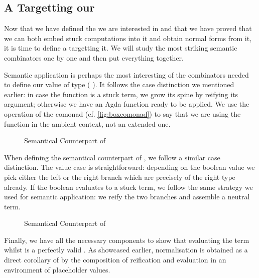 \subsection{A  Targetting our }

Now that we have defined the  we are interested in and that
we have proved that we can both embed stuck computations into it and
obtain normal forms from it, it is time to define a 
targetting it. We will study the most striking semantic combinators
one by one and then put everything together.

Semantic application is perhaps the most interesting of the combinators
needed to define our value of type (  ).
It follows the case distinction we mentioned earlier: in case the function
is a stuck term, we grow its spine by reifying its argument; otherwise we
have an Agda function ready to be applied. We use the  operation
of the  comonad (cf. \cref{fig:boxcomonad}) to say that we are using
the function in the ambient context, not an extended one.

\begin{figure}[h]
\caption{Semantical Counterpart of }
\end{figure}

When defining the semantical counterpart of , we follow a similar
case distinction.
%
The value case is straightforward: depending on the boolean value we
pick either the left or the right branch which are precisely of the right
type already.
%
If the boolean evaluates to a stuck term, we follow the same strategy we
used for semantic application: we reify the two branches and assemble a
neutral term.

\begin{figure}[h]
\caption{Semantical Counterpart of }
\end{figure}

Finally, we have all the necessary components to show that evaluating
the term whilst is a perfectly valid . As showcased earlier,
normalisation is obtained as a direct corollary of  by the
composition of reification and evaluation in an environment of placeholder
values.


